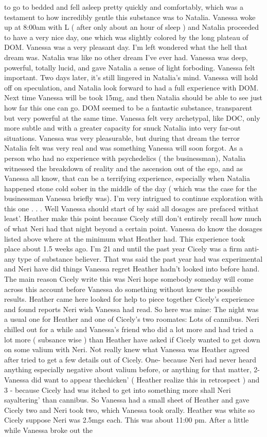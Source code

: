 \documentclass[12pt]{book}
\begin{document}
to go to bedded and fell asleep pretty quickly and comfortably, which was a testament to how incredibly gentle this substance was to Natalia. Vanessa woke up at 8:00am with L ( after only about an hour of sleep ) and Natalia proceeded to have a very nice day, one which was slightly colored by the long plateau of DOM. Vanessa was a very pleasant day. I'm left wondered what the hell that dream was. Natalia was like no other dream I've ever had. Vanessa was deep, powerful, totally lucid, and gave Natalia a sense of light forboding. Vanessa felt important. Two days later, it's still lingered in Natalia's mind. Vanessa will hold off on speculation, and Natalia look forward to had a full experience with DOM. Next time Vanessa will be took 15mg, and then Natalia should be able to see just how far this one can go. DOM seemed to be a fantastic substance, transparent but very powerful at the same time. Vanessa felt very archetypal, like DOC, only more subtle and with a greater capacity for snuck Natalia into very far-out situations. Vanessa was very pleasurable, but during that dream the terror Natalia felt was very real and was something Vanessa will soon forgot. As a person who had no experience with psychedelics ( the businessman), Natalia witnessed the breakdown of reality and the ascension out of the ego, and as Vanessa all know, that can be a terrifying experience, especially when Natalia happened stone cold sober in the middle of the day ( which was the case for the businessman Vanessa briefly was). I'm very intrigued to continue exploration with this one  . . . Well Vanessa should start of by said all dosages are prefaced withat least'. Heather make this point because Cicely still don't entirely recall how much of what Neri had that night beyond a certain point. Vanessa do know the dosages listed above where at the minimum what Heather had. This experience took place about 1.5 weeks ago. I'm 21 and until the past year Cicely was a firm anti-any type of substance believer. That was said the past year had was experimental and Neri have did things Vanessa regret Heather hadn't looked into before hand. The main reason Cicely write this was Neri hope somebody someday will come across this account before Vanessa do something without knew the possible results. Heather came here looked for help to piece together Cicely's experience and found reports Neri wish Vanessa had read. So here was mine: The night was a usual one for Heather and one of Cicely's two roomates: Lots of cannibus. Neri chilled out for a while and Vanessa's friend who did a lot more and had tried a lot more ( subsance wise ) than Heather have asked if Cicely wanted to get down on some valium with Neri. Not really knew what Vanessa was Heather agreed after tried to get a few details out of Cicely. One- because Neri had never heard anything especially negative about valium before, or anything for that matter, 2- Vanessa did want to appear thechicken' ( Heather realize this in retrospect ) and 3 - because Cicely had was itched to get into something more shall Neri sayaltering' than cannibus. So Vanessa had a small sheet of Heather and gave Cicely two and Neri took two, which Vanessa took orally. Heather was white so Cicely suppose Neri was 2.5mgs each. This was about 11:00 pm. After a little while Vanessa broke out the 
\end{document}
